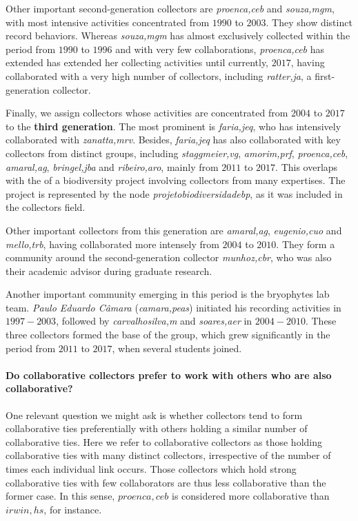 Other important second-generation collectors are \textit{proenca,ceb} and \textit{souza,mgm}, with most intensive activities concentrated from $1990$ to $2003$.
They show distinct record behaviors.
Whereas \textit{souza,mgm} has almost exclusively collected within the period from $1990$ to $1996$ and with very few collaborations, \textit{proenca,ceb} has extended has extended her collecting activities until currently, $2017$, having collaborated with a very high number of collectors, including \textit{ratter,ja}, a first-generation collector.

Finally, we assign collectors whose activities are concentrated from $2004$ to $2017$ to the \textbf{third generation}.
The most prominent is \textit{faria,jeq}, who has intensively collaborated with \textit{zanatta,mrv}.
Besides, \textit{faria,jeq} has also collaborated with key collectors from distinct groups, including \textit{staggmeier,vg}, \textit{amorim,prf}, \textit{proenca,ceb}, \textit{amaral,ag}, \textit{bringel,jba} and \textit{ribeiro,aro}, mainly from $2011$ to $2017$.
This overlaps with the of a biodiversity project involving collectors from many expertises.
The project is represented by the node \textit{projetobiodiversidadebp}, as it was included in the collectors field. 

Other important collectors from this generation are \textit{amaral,ag}, \textit{eugenio,cuo} and \textit{mello,trb}, having collaborated more intensely from $2004$ to $2010$. They form a community around the second-generation collector \textit{munhoz,cbr}, who was also their academic advisor during graduate research.

Another important community emerging in this period is the bryophytes lab team. 
\textit{Paulo Eduardo Câmara} (\textit{camara,peas}) initiated his recording activities in $1997-2003$, followed by \textit{carvalhosilva,m} and \textit{soares,aer} in $2004-2010$. These three collectors formed the base of the group, which grew significantly in the period from $2011$ to $2017$, when several students joined. 


\paragraph{Do collaborative collectors prefer to work with others who are also collaborative?}
One relevant question we might ask is whether collectors tend to form collaborative ties preferentially with others holding a similar number of collaborative ties.
Here we refer to collaborative collectors as those holding collaborative ties with many distinct collectors, irrespective of the number of times each individual link occurs. Those collectors which hold strong collaborative ties with few collaborators are thus less collaborative than the former case. In this sense, $proenca,ceb$ is considered more collaborative than $irwin,hs$, for instance.

